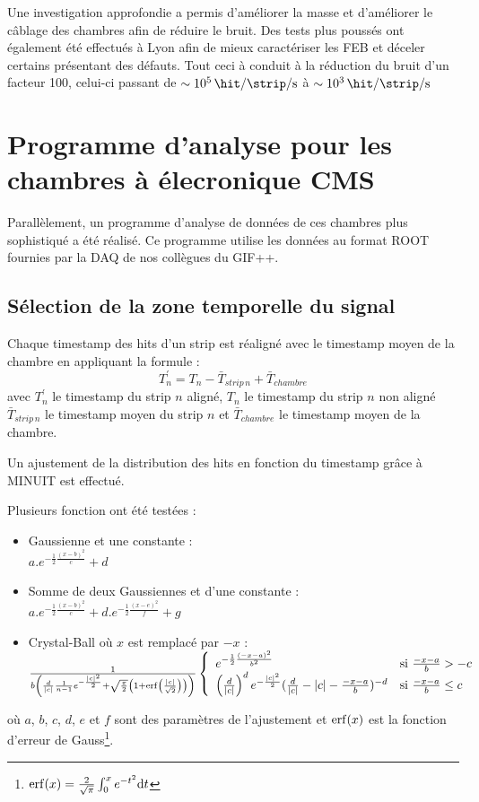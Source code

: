Une investigation approfondie a permis d'améliorer la masse et d'améliorer le câblage des chambres afin de réduire le bruit. Des tests plus poussés ont également été effectués à Lyon afin de mieux caractériser les FEB et déceler certains présentant des défauts. Tout ceci à conduit à la réduction du bruit d'un facteur \num{100}, celui-ci passant de $\sim\SI{e5}{\hit\per\strip\per\second}$ à $\sim\SI{e3}{\hit\per\strip\per\second}$
\vspace*{-0.5cm}
\section{Programme d’analyse pour les chambres à élecronique CMS}
\vspace*{-0.4cm}
\label{prog}
Parallèlement, un programme d'analyse de données de ces chambres plus sophistiqué a été réalisé. Ce programme utilise les données au format ROOT fournies par la DAQ de nos collègues du GIF++.
\vspace*{-0.4cm}
\subsection{Sélection de la zone temporelle du signal}
\vspace*{-0.4cm}
Chaque timestamp des hits d'un strip est réaligné avec le timestamp moyen de la chambre en appliquant la formule :
\begin{equation}
T^{'}_{n}=T_{n}-\bar{T}_{strip\, n}+\bar{T}_{chambre}
\end{equation}
avec $T^{'}_{n}$ le timestamp du strip $n$ aligné, $T_{n}$ le timestamp du strip $n$ non aligné $\bar{T}_{strip\, n}$ le timestamp moyen du strip $n$ et $\bar{T}_{chambre}$ le timestamp moyen de la chambre. 

Un ajustement de la distribution des hits en fonction du timestamp grâce à MINUIT est effectué. 

Plusieurs fonction ont été testées :
\begin{itemize}[label=$\bullet$]
	\item Gaussienne et une constante : \\ $a.e^{-\frac{1}{2}\frac{(x-b)^2}{c}}+d$ 
	\item Somme de deux Gaussiennes et d'une constante : \\ $a.e^{-\frac{1}{2}\frac{(x-b)^2}{c}}+d.e^{-\frac{1}{2}\frac{(x-e)^2}{f}}+g$ 
	\item Crystal-Ball où $x$ est remplacé par $-x$ : \\ $\frac{1}{b\left(\frac{d}{|c|}\frac{1}{n-1}e^{-\frac{|c|^2}{2}}+\sqrt{\frac{\pi}{2}}\left(1+\erf\left(\frac{|c|}{\sqrt{2}}\right)\right) \right)}\left\{
	\begin{array}{ll}
	e^{-\frac{1}{2}\frac{(-x-a)^2}{b^2}} & \mbox{si } \frac{-x-a}{b}>-c \\
	\left(\frac{d}{|c|}\right)^d e^{-\frac{|c|^2}{2}} (\frac{d}{|c|}-|c|-\frac{-x-a}{b})^{-d} & \mbox{si }\frac{-x-a}{b}\leq c
	\end{array}
	\right.$
\end{itemize}
où $a$, $b$, $c$, $d$, $e$ et $f$ sont des paramètres de l'ajustement et $\erf(x)$ est la fonction d'erreur de Gauss\footnote{$\erf(x)=\frac{2}{\sqrt{\pi}}\int_0^x e^{-t^2} \dd t$}.

